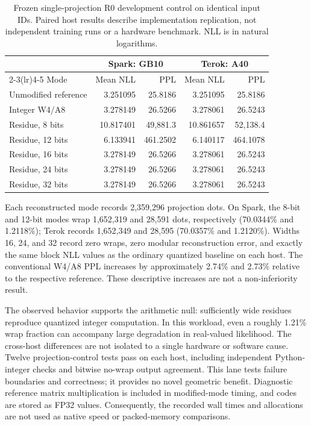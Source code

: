 \documentclass[11pt]{article}
\begin{document}
\begin{table}[htbp]
\centering
\small
\caption{Frozen single-projection R0 development control on identical input
IDs. Paired host results describe implementation replication, not independent
training runs or a hardware benchmark. NLL is in natural logarithms.}
\begin{tabular}{lrrrr}
\toprule
 & \multicolumn{2}{c}{Spark: GB10} & \multicolumn{2}{c}{Terok: A40}\\
\cmidrule(lr){2-3}\cmidrule(lr){4-5}
Mode & Mean NLL & PPL & Mean NLL & PPL\\
\midrule
Unmodified reference & 3.251095 & 25.8186 & 3.251095 & 25.8186\\
Integer W4/A8 & 3.278149 & 26.5266 & 3.278061 & 26.5243\\
Residue, 8 bits & 10.817401 & 49,881.3 & 10.861657 & 52,138.4\\
Residue, 12 bits & 6.133941 & 461.2502 & 6.140117 & 464.1078\\
Residue, 16 bits & 3.278149 & 26.5266 & 3.278061 & 26.5243\\
Residue, 24 bits & 3.278149 & 26.5266 & 3.278061 & 26.5243\\
Residue, 32 bits & 3.278149 & 26.5266 & 3.278061 & 26.5243\\
\bottomrule
\end{tabular}
\label{tab:r0}
\end{table}

Each reconstructed mode records 2,359,296 projection dots. On Spark, the
8-bit and 12-bit modes wrap 1,652,319 and 28,591 dots, respectively
(70.0344\% and 1.2118\%); Terok records 1,652,349 and 28,595
(70.0357\% and 1.2120\%). Widths 16, 24, and 32 record zero wraps,
zero modular reconstruction error, and exactly the same block NLL values as
the ordinary quantized baseline on each host. The conventional W4/A8 PPL
increases by approximately 2.74\% and 2.73\% relative to the respective
reference. These descriptive increases are not a non-inferiority result.

The observed behavior supports the arithmetic null: sufficiently wide residues
reproduce quantized integer computation. In this workload, even a roughly
1.21\% wrap fraction can accompany large degradation in real-valued likelihood.
The cross-host differences are not isolated to a single hardware or software
cause. Twelve projection-control tests pass on each host, including independent
Python-integer checks and bitwise no-wrap output agreement. This lane tests
failure boundaries and correctness; it provides no novel geometric benefit.
Diagnostic reference matrix multiplication is included in modified-mode timing,
and codes are stored as FP32 values. Consequently, the recorded wall times and
allocations are not used as native speed or packed-memory comparisons.
\end{document}

